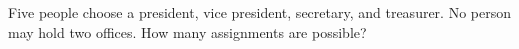 Five people choose a president, vice president, secretary, and treasurer. No person may hold two offices. How many assignments are possible?
